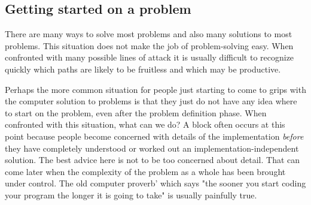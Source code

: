 \documentclass{book}
\begin{document}
\subsection{Getting started on a problem}
	There are many ways to solve most problems and also many solutions to most problems. This situation does not make the job of problem-solving easy. When confronted with many possible lines of attack it is usually difficult to recognize quickly which paths are likely to be fruitless and which may be productive.\par
	Perhaps the more common situation for people just starting to come to grips with the computer solution to problems is that they just do not have any idea where to start on the problem, even after the problem definition phase. When confronted with this situation, what can we do? A block often occurs at this point because people become concerned with details of the implementation \textit{before} they have completely understood or worked out an implementation-independent solution. The best advice here is not to be too concerned about detail. That can come later when the complexity of the problem as a whole has been brought under control. The old computer proverb' which says "the sooner you start coding your program the longer it is going to take" is usually painfully true.\par
\end{document}
